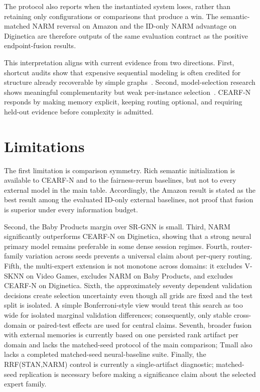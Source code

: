 \documentclass[runningheads]{llncs}
\newcommand{\method}{CEARF-N}
\begin{document}
The protocol also reports when the instantiated system loses, rather than
retaining only configurations or comparisons that produce a win. The
semantic-matched NARM reversal on Amazon and the ID-only NARM advantage on
Diginetica are therefore outputs of the same evaluation contract as the
positive endpoint-fusion results.

This interpretation aligns with current evidence from two directions. First,
shortcut audits show that expensive sequential modeling is often credited for
structure already recoverable by simple graphs~\cite{graphshortcut2026}.
Second, model-selection research shows meaningful complementarity but weak
per-instance selection~\cite{algselect2025}. \method{} responds by making
memory explicit, keeping routing optional, and requiring held-out evidence
before complexity is admitted.

\section{Limitations}
The first limitation is comparison symmetry. Rich semantic initialization is
available to \method{} and to the fairness-rerun baselines, but not to every
external model in the main table. Accordingly, the Amazon result is stated as
the best result among the evaluated ID-only external baselines, not proof that
fusion is superior under every information budget.

Second, the Baby Products margin over SR-GNN is small. Third, NARM
significantly outperforms \method{} on Diginetica, showing that a strong
neural primary model remains preferable in some dense session regimes. Fourth,
router-family variation across seeds prevents a universal claim about
per-query routing. Fifth, the multi-expert extension is not monotone across
domains: it excludes V-SKNN on Video Games, excludes NARM on Baby Products,
and excludes \method{} on Diginetica. Sixth, the
approximately seventy dependent
validation decisions create selection uncertainty even though all grids are
fixed and the test split is isolated. A simple Bonferroni-style view would
treat this search as too wide for isolated marginal validation differences;
consequently, only stable cross-domain or paired-test effects are used for
central claims. Seventh, broader fusion with external memories is currently
based on one persisted rank artifact per domain and lacks the matched-seed
protocol of the main comparison; Tmall also lacks a completed matched-seed
neural-baseline suite.
Finally, the RRF(STAN,NARM) control is currently a single-artifact diagnostic;
matched-seed replication is necessary before making a significance claim about
the selected expert family.
\end{document}

